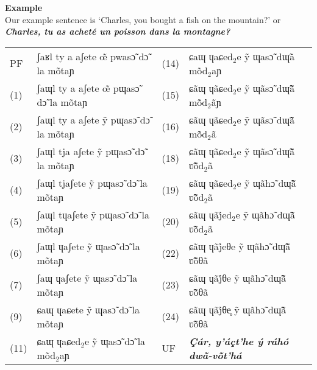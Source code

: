 \documentclass[a4paper, 12pt, oneside, final]{article}
\def\parheading#1{\noindent\textbf{#1}}
\begin{document}
\parheading{Example}\\
Our example sentence is ‘Charles, you bought a fish on the mountain?’ or \textbf{\textit{Charles, tu as acheté un pois\-son dans la montagne?}}\par\medskip
\noindent\begin{tabular}{@{}>{}l>{}l>{}l>{}l}
PF& ʃaʁl ty a aʃete œ̃ pwasɔ̃ dɔ̃ la mõtaɲ &(14)& ɕaɰ ɥaɕed$_2$e ỹ ɰasɔ̃ dɰ̃a mõd$_2$aɲ \\
(1)&ʃaɰl ty a aʃete œ̃ pɰasɔ̃ dɔ̃ la mõtaɲ &(15)&ɕãɰ ɥãɕed$_2$e ỹ ɰãsɔ̃ dɰ̃ã̃ mõ̃d$_2$ãɲ \\
(2)&ʃaɰl ty a aʃete ỹ pɰasɔ̃ dɔ̃ la mõtaɲ &(16)&ɕãɰ ɥãɕed$_2$e ỹ ɰãsɔ̃ dɰ̃ã̃ mõ̃d$_2$ã \\
(3)&ʃaɰl tja aʃete ỹ pɰasɔ̃ dɔ̃ la mõtaɲ &(18)&ɕãɰ ɥãɕed$_2$e ỹ ɰãsɔ̃ dɰ̃ã̃ ʋ̃õ̃d$_2$ã \\
(4)&ʃaɰl tjaʃete ỹ pɰasɔ̃ dɔ̃ la mõtaɲ &(19)&ɕãɰ ɥãɕed$_2$e ỹ ɰãhɔ̃ dɰ̃ã̃ ʋ̃õ̃d$_2$ã \\
(5)&ʃaɰl tɥaʃete ỹ pɰasɔ̃ dɔ̃ la mõtaɲ &(20)&ɕãɰ ɥãj̊ed$_2$e ỹ ɰãhɔ̃ dɰ̃ã̃ ʋ̃õ̃d$_2$ã \\
(6)&ʃaɰl ɥaʃete ỹ ɰasɔ̃ dɔ̃ la mõtaɲ &(22)&ɕãɰ ɥãj̊eθe ỹ ɰãhɔ̃ dɰ̃ã̃ ʋ̃õ̃θã \\
(7)&ʃaɰ ɥaʃete ỹ ɰasɔ̃ dɔ̃ la mõtaɲ &(23)&ɕãɰ ɥãj̊θe ỹ ɰãhɔ̃ dɰ̃ã̃ ʋ̃õ̃θã \\
(9)&ɕaɰ ɥaɕete ỹ ɰasɔ̃ dɔ̃ la mõtaɲ &(24)&ɕãɰ ɥãj̊θe̥ ỹ ɰãhɔ̃ dɰ̃ã̃ ʋ̃õ̃θã \\
(11)&ɕaɰ ɥaɕed$_2$e ỹ ɰasɔ̃ dɔ̃ la mõd$_2$aɲ &UF&\bfseries\itshape Çár, y’áçt’he ý ráhó dwã-võt’há \\
\end{tabular}
\end{document}
